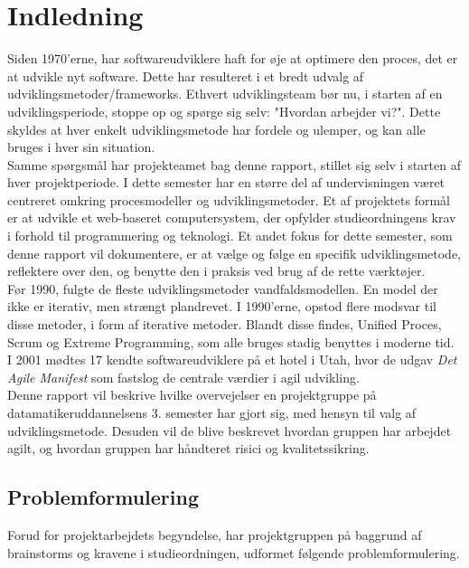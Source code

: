 \chapter{Indledning}\label{ch:indledning}
Siden 1970'erne, har softwareudviklere haft for øje at optimere den proces, det er at udvikle nyt software.
Dette har resulteret i et bredt udvalg af udviklingsmetoder/frameworks. Ethvert udviklingsteam bør nu, i starten af en udviklingsperiode,
stoppe op og spørge sig selv: "Hvordan arbejder vi?". Dette skyldes at hver enkelt udviklingsmetode har fordele og ulemper, og kan alle bruges
i hver sin situation. \\

Samme spørgsmål har projekteamet bag denne rapport, stillet sig selv i starten af hver projektperiode. I dette semester har en større del af undervisningen
været centreret omkring procesmodeller og udviklingsmetoder. Et af projektets formål er at udvikle et web-baseret computersystem, der opfylder studieordningens krav
i forhold til programmering og teknologi. Et andet fokus for dette semester, som denne rapport vil dokumentere, er at vælge og følge en specifik udviklingsmetode, 
reflektere over den, og benytte den i praksis ved brug af de rette værktøjer. \\

Før 1990, fulgte de fleste udviklingsmetoder vandfaldsmodellen. En model der ikke er iterativ, men strængt plandrevet. I 1990'erne, opstod flere modsvar til
disse metoder, i form af iterative metoder. Blandt disse findes, Unified Proces, Scrum og Extreme Programming, som alle bruges stadig benyttes i moderne tid.
I 2001 mødtes 17 kendte softwareudviklere på et hotel i Utah, hvor de udgav \textit{Det Agile Manifest} som fastslog de centrale værdier i agil udvikling. \\

Denne rapport vil beskrive hvilke overvejelser en projektgruppe på datamatikeruddannelsens 3. semester har gjort sig, med hensyn til valg af udviklingsmetode.
Desuden vil de blive beskrevet hvordan gruppen har arbejdet agilt, og hvordan gruppen har håndteret risici og kvalitetssikring.

\newpage
\section{Problemformulering}
Forud for projektarbejdets begyndelse, har projektgruppen på baggrund af brainstorms og kravene i
studieordningen, udformet følgende problemformulering. \\

